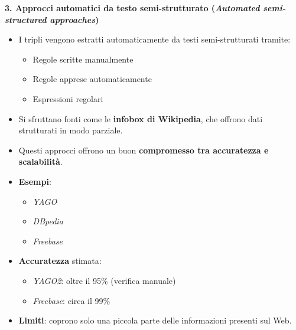 \vspace{1em}
\textbf{3. Approcci automatici da testo semi-strutturato (\textit{Automated semi-structured approaches})}
\begin{itemize}
  \item I tripli vengono estratti automaticamente da testi semi-strutturati tramite:
  \begin{itemize}
    \item Regole scritte manualmente
    \item Regole apprese automaticamente
    \item Espressioni regolari
  \end{itemize}
  \item Si sfruttano fonti come le \textbf{infobox di Wikipedia}, che offrono dati strutturati in modo parziale.
  \item Questi approcci offrono un buon \textbf{compromesso tra accuratezza e scalabilità}.
  \item \textbf{Esempi}:
  \begin{itemize}
    \item \textit{YAGO}
    \item \textit{DBpedia}
    \item \textit{Freebase}
  \end{itemize}
  \item \textbf{Accuratezza} stimata:
  \begin{itemize}
    \item \textit{YAGO2}: oltre il 95\% (verifica manuale)
    \item \textit{Freebase}: circa il 99\%
  \end{itemize}
  \item \textbf{Limiti}: coprono solo una piccola parte delle informazioni presenti sul Web.
\end{itemize}

